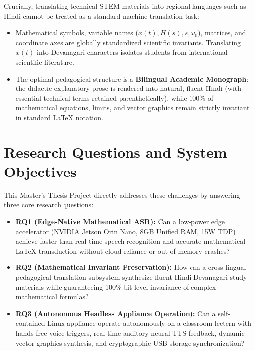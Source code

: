 \documentclass[11pt,a4paper,oneside]{report}
\begin{document}
Crucially, translating technical STEM materials into regional languages such as Hindi cannot be treated as a standard machine translation task:
\begin{itemize}[noitemsep]
    \item Mathematical symbols, variable names ($x(t), H(s), s, \omega_0$), matrices, and coordinate axes are globally standardized scientific invariants. Translating $x(t)$ into Devanagari characters isolates students from international scientific literature.
    \item The optimal pedagogical structure is a \textbf{Bilingual Academic Monograph}: the didactic explanatory prose is rendered into natural, fluent Hindi (with essential technical terms retained parenthetically), while 100\% of mathematical equations, limits, and vector graphics remain strictly invariant in standard LaTeX notation.
\end{itemize}

\section{Research Questions and System Objectives}
This Master's Thesis Project directly addresses these challenges by answering three core research questions:
\begin{itemize}
    \item \textbf{RQ1 (Edge-Native Mathematical ASR):} Can a low-power edge accelerator (NVIDIA Jetson Orin Nano, 8GB Unified RAM, 15W TDP) achieve faster-than-real-time speech recognition and accurate mathematical LaTeX transduction without cloud reliance or out-of-memory crashes?
    \item \textbf{RQ2 (Mathematical Invariant Preservation):} How can a cross-lingual pedagogical translation subsystem synthesize fluent Hindi Devanagari study materials while guaranteeing 100\% bit-level invariance of complex mathematical formulas?
    \item \textbf{RQ3 (Autonomous Headless Appliance Operation):} Can a self-contained Linux appliance operate autonomously on a classroom lectern with hands-free voice triggers, real-time auditory neural TTS feedback, dynamic vector graphics synthesis, and cryptographic USB storage synchronization?
\end{itemize}
\end{document}
